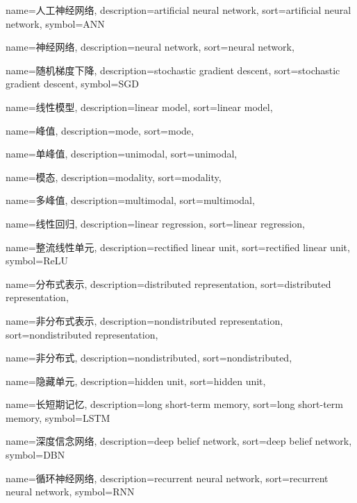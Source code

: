 {
  name=人工神经网络,
  description={artificial neural network},
  sort={artificial neural network},
  symbol={ANN}
}

{
  name=神经网络,
  description={neural network},
  sort={neural network},
}

{
  name=随机梯度下降,
  description={stochastic gradient descent},
  sort={stochastic gradient descent},
  symbol={SGD}
}

{
  name=线性模型,
  description={linear model},
  sort={linear model},
}

{
  name=峰值,
  description={mode},
  sort={mode},
}

{
  name=单峰值,
  description={unimodal},
  sort={unimodal},
}

{
	name=模态,
	description={modality},
	sort={modality},
}

{
	name=多峰值,
	description={multimodal},
	sort={multimodal},
}

{
  name=线性回归,
  description={linear regression},
  sort={linear regression},
}

{
  name=整流线性单元,
  description={rectified linear unit},
  sort={rectified linear unit},
  symbol={ReLU}
}

{
  name=分布式表示,
  description={distributed representation},
  sort={distributed representation},
}

{
  name=非分布式表示,
  description={nondistributed representation},
  sort={nondistributed representation},
}


{
	name=非分布式,
	description={nondistributed},
	sort={nondistributed},
}

{
  name=隐藏单元,
  description={hidden unit},
  sort={hidden unit},
}

{
  name=长短期记忆,
  description={long short-term memory},
  sort={long short-term memory},
  symbol={LSTM}
}

{
  name=深度信念网络,
  description={deep belief network},
  sort={deep belief network},
  symbol={DBN}
}

{
  name=循环神经网络,
  description={recurrent neural network},
  sort={recurrent neural network},
  symbol={RNN}
}

